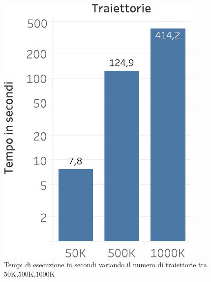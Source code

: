 \begin{figure}
  \centering
  \includegraphics[scale=.5]{res/fig/sec-4/performance/ScalabilityOnOldenburg.pdf}
  \caption{Tempi di esecuzione in secondi variando il numero di traiettorie tra \(50\)K,\(500\)K,\(1000\)K}%
  \label{fig:chap-4:ScalabilityOldenburg}
\end{figure}

